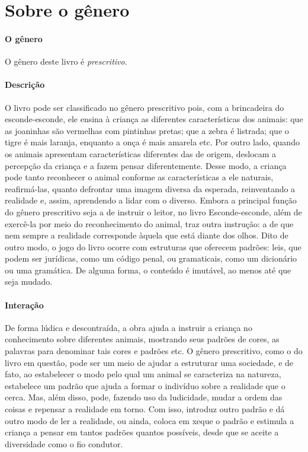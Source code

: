 \documentclass[11pt]{extarticle}
\begin{document}
\section{Sobre o gênero}

\paragraph{O gênero} O gênero deste livro é \textit{prescritivo}. 


\paragraph{Descrição} O livro pode ser classificado no gênero prescritivo pois, com a brincadeira do esconde-esconde, ele ensina à criança as diferentes características dos animais: que as joaninhas são vermelhas com pintinhas pretas; que a zebra é listrada; que o tigre é mais laranja, enquanto a onça é mais amarela etc. Por outro lado, quando os animais apresentam características diferentes das de origem, deslocam a percepção da criança e a fazem pensar diferentemente. Desse modo, a criança pode tanto reconhecer o animal conforme as características a ele naturais, reafirmá-las, quanto defrontar uma imagem diversa da esperada, reinventando a realidade e, assim, aprendendo a lidar com o diverso. Embora a principal função do gênero prescritivo seja a de instruir o leitor, no livro Esconde-esconde, além de exercê-la por meio do reconhecimento do animal, traz outra instrução: a de que nem sempre a realidade corresponde àquela que está diante dos olhos. Dito de outro modo, o jogo do livro ocorre com estruturas que oferecem padrões: leis, que podem ser jurídicas, como um código penal, ou gramaticais, como um dicionário ou uma gramática. De alguma forma, o conteúdo é imutável, ao menos até que seja mudado. 

\paragraph{Interação} De forma lúdica e descontraída, a obra ajuda a instruir a criança no conhecimento sobre diferentes animais, mostrando seus padrões de cores, as palavras para denominar tais cores e padrões etc. O gênero prescritivo, como o do livro em questão, pode ser um meio de ajudar a estruturar uma sociedade, e de fato, ao estabelecer o modo pelo qual um animal se caracteriza na natureza, estabelece um padrão que ajuda a formar o indivíduo sobre a realidade que o cerca. Mas, além disso, pode, fazendo uso da ludicidade, mudar a ordem das coisas e repensar a realidade em torno. Com isso, introduz outro padrão e dá outro modo de ler a realidade, ou ainda, coloca em xeque o padrão e estimula a criança a pensar em tantos padrões quantos possíveis, desde que se aceite a diversidade como o fio condutor.
\end{document}
